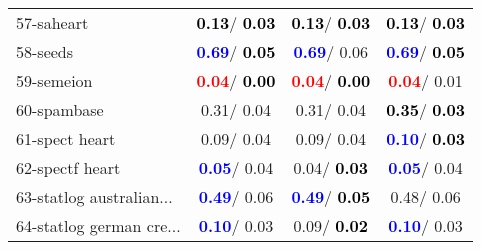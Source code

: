 \begin{table}[h]
\begin{center}
\begin{tabular}{lc|c|c}
57-saheart & \textcolor{black}{\textbf{  0.13}}/\textcolor{black}{\textbf{  0.03}} & \textcolor{black}{\textbf{  0.13}}/\textcolor{black}{\textbf{  0.03}} & \textcolor{black}{\textbf{  0.13}}/\textcolor{black}{\textbf{  0.03}} \\
58-seeds & \textcolor{blue}{\textbf{  0.69}}/\textcolor{black}{\textbf{  0.05}} & \textcolor{blue}{\textbf{  0.69}}/  0.06 & \textcolor{blue}{\textbf{  0.69}}/\textcolor{black}{\textbf{  0.05}} \\
59-semeion & \textcolor{red}{\textbf{  0.04}}/\textcolor{black}{\textbf{  0.00}} & \textcolor{red}{\textbf{  0.04}}/\textcolor{black}{\textbf{  0.00}} & \textcolor{red}{\textbf{  0.04}}/  0.01 \\
60-spambase &   0.31/  0.04 &   0.31/  0.04 & \textcolor{black}{\textbf{  0.35}}/\textcolor{black}{\textbf{  0.03}} \\ \hline
61-spect heart &   0.09/  0.04 &   0.09/  0.04 & \textcolor{blue}{\textbf{  0.10}}/\textcolor{black}{\textbf{  0.03}} \\
62-spectf heart & \textcolor{blue}{\textbf{  0.05}}/  0.04 &   0.04/\textcolor{black}{\textbf{  0.03}} & \textcolor{blue}{\textbf{  0.05}}/  0.04 \\
63-statlog australian... & \textcolor{blue}{\textbf{  0.49}}/  0.06 & \textcolor{blue}{\textbf{  0.49}}/\textcolor{black}{\textbf{  0.05}} &   0.48/  0.06 \\
64-statlog german cre... & \textcolor{blue}{\textbf{  0.10}}/  0.03 &   0.09/\textcolor{black}{\textbf{  0.02}} & \textcolor{blue}{\textbf{  0.10}}/  0.03 \\\end{tabular}\label{stratsALCKappa1bCIELMRedux}
\end{center}
\end{table}
